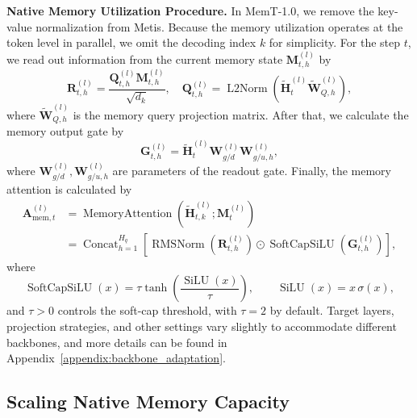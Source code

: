 \textbf{Native Memory Utilization Procedure.}
In MemT-1.0, we remove the key-value normalization from Metis.
Because the memory utilization operates at the token level in parallel, we omit the decoding index $k$ for simplicity.
For the step $t$, we read out information from the current memory state $\mathbf{M}_{t,h}^{(l)}$ by
\begin{equation*}
    \mathbf{R}_{t,h}^{(l)} = \frac{\mathbf{Q}_{t,h}^{(l)} \mathbf{M}_{t,h}^{(l)}}{\sqrt{d_k}}, 
    \quad \mathbf{Q}_{t,h}^{(l)} = \operatorname{L2Norm}\left(\tilde{\mathbf{H}}^{(l)}_{t} \tilde{\mathbf{W}}_{Q,h}^{(l)}\right),
\end{equation*}
where $\tilde{\mathbf{W}}_{Q,h}^{(l)}$ is the memory query projection matrix.
After that, we calculate the memory output gate by 
\begin{equation*}
    \mathbf{G}_{t,h}^{(l)} = \tilde{\mathbf{H}}^{(l)}_{t} \mathbf{W}_{g/d}^{(l)} \mathbf{W}_{g/u,h}^{(l)},
\end{equation*}
where $\mathbf{W}_{g/d}^{(l)},\mathbf{W}_{g/u,h}^{(l)}$ are parameters of the readout gate.
Finally, the memory attention is calculated by
\begin{equation*}
    \begin{aligned}
        \mathbf{A}_{\text{mem},t}^{(l)} & = \operatorname{MemoryAttention}\left( \tilde{\mathbf{H}}^{(l)}_{t,k}; \mathbf{M}_{t}^{(l)} \right) \\
        & = \operatorname{Concat}_{h=1}^{H_{q}}\left[ \operatorname{RMSNorm}\left( \mathbf{R}_{t,h}^{(l)} \right) \odot \operatorname{SoftCapSiLU}\left( \mathbf{G}_{t,h}^{(l)}\right) \right],
    \end{aligned}
\end{equation*}
where
\begin{equation*}
    \operatorname{SoftCapSiLU}(x)
    =
    \tau \tanh\left(
        \frac{\operatorname{SiLU}(x)}{\tau}
    \right),
    \qquad
    \operatorname{SiLU}(x) = x\,\sigma(x),
\end{equation*}
and $\tau > 0$ controls the soft-cap threshold, with $\tau = 2$ by default.
Target layers, projection strategies, and other settings vary slightly to accommodate different backbones, and more details can be found in Appendix~\ref{appendix:backbone_adaptation}.

\subsection{Scaling Native Memory Capacity}

